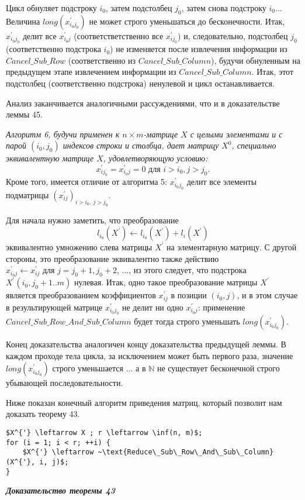 \begin{myproof}
Цикл обнуляет подстроку $i_0$, затем подстолбец $j_0$, затем снова подстроку $i_0...$ Величина $long(x^{'}_{i_0j_0})$ не может строго уменьшаться до бесконечности. Итак, $x^{'}_{i_0j_0}$ делит все $x^{'}_{i_0j}$ (соответстветственно все $x^{'}_{ij_0}$) и, следовательно, подстолбец $j_0$ (соответственно подстрока $i_0$) не изменяется после извлечения информации из $Cancel\_Sub\_Row$ (соответственно из $Cancel\_Sub\_Column$), будучи обнуленным на предыдущем этапе извлечением информации из $Cancel\_Sub\_Column$. Итак, этот подстолбец (соответственно подстрока) ненулевой и цикл останавливается.

\noindent Анализ заканчивается аналогичными рассуждениями, что и в доказательстве леммы 45.\\
\end{myproof}
\begin{lemma}
\hspace*{0.5cm}

\textit{Алгоритм 6, будучи применен к $n \times m$-матрице $X$ с целыми элементами и с парой $(i_0,j_0)$ индексов строки и столбца, дает матрицу $X^{0}$, специально эквивалентную матрице $X$, удовлетворяющую условию:}
$$ x^{'}_{ij_0} = x^{'}_{i_0j} = 0 \text{ для } i > i_0, j > j_0.$$
Кроме того, имеется отличие от алгоритма 5: $ x^{'}_{i_0j_0} $ делит все элементы подматрицы $(x^{'}_{ij})_{i>i_0,~j>j_0}.$
\end{lemma}
\begin{myproof}
Для начала нужно заметить, что преобразование
$$ l_{i_0}(X^{'}) \leftarrow l_{i_0}(X^{'}) + l_{i}(X^{'}) $$
эквивалентно умножению слева матрицы $X^{'}$ на элементарную матрицу. С другой стороны, это преобразование эквивалентно также действию \\ $x^{'}_{i_0 j} \leftarrow x^{'}_{i j}$ для $j = j_0 + 1, j_0 + 2$, ..., из этого следует, что подстрока \\ $X^{'}(i_0, j_0+1 .. m)$ нулевая. Итак, одно такое преобразование матрицы $X^{'}$ является преобразованием коэффициентов $ x^{'}_{ij}$ в позиции $(i_0, j)$, и в этом случае в результирующей матрице $ x^{'}_{i_0j_0} $ не делит ни одно $ x^{'}_{i_0j}$: применение \\ $Cancel\_Sub\_Row\_And\_Sub\_Column$ будет тогда строго уменьшать $long(x^{'}_{i_0j_0})$.

\noindent Конец доказательства аналогичен концу доказательства предыдущей леммы. В каждом проходе тела цикла, за исключением может быть первого раза, значение $long(x^{'}_{i_0j_0})$ строго уменьшается ... а в $\mathbb{N}$ не существует бесконечной строго убывающей последовательности.
\end{myproof}
Ниже показан конечный алгоритм приведения матриц, который позволит нам доказать теорему 43.\\
\begin{lstlisting}[mathescape=true]
$X^{'} \leftarrow X ; r \leftarrow \inf(n, m)$;
for (i = 1; i < r; ++i) {
	$X^{'} \leftarrow ~\text{Reduce\_Sub\_Row\_And\_Sub\_Column}(X^{'}, i, j)$;
}
\end{lstlisting}
\newpage
\noindent\textbf{\textit{Доказательство теоремы 43}}\\

